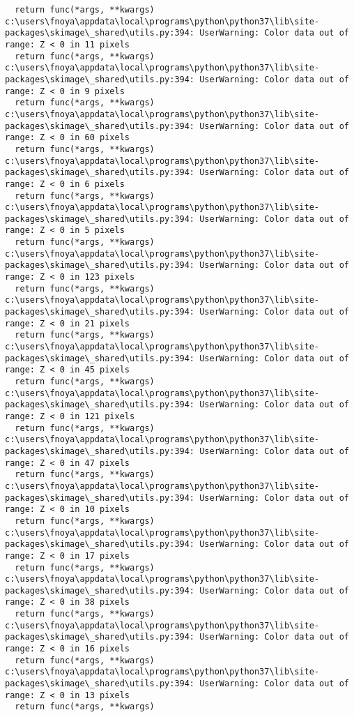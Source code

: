 \documentclass[
]{article}
\begin{document}
\begin{verbatim}
  return func(*args, **kwargs)
c:\users\fnoya\appdata\local\programs\python\python37\lib\site-packages\skimage\_shared\utils.py:394: UserWarning: Color data out of range: Z < 0 in 11 pixels
  return func(*args, **kwargs)
c:\users\fnoya\appdata\local\programs\python\python37\lib\site-packages\skimage\_shared\utils.py:394: UserWarning: Color data out of range: Z < 0 in 9 pixels
  return func(*args, **kwargs)
c:\users\fnoya\appdata\local\programs\python\python37\lib\site-packages\skimage\_shared\utils.py:394: UserWarning: Color data out of range: Z < 0 in 60 pixels
  return func(*args, **kwargs)
c:\users\fnoya\appdata\local\programs\python\python37\lib\site-packages\skimage\_shared\utils.py:394: UserWarning: Color data out of range: Z < 0 in 6 pixels
  return func(*args, **kwargs)
c:\users\fnoya\appdata\local\programs\python\python37\lib\site-packages\skimage\_shared\utils.py:394: UserWarning: Color data out of range: Z < 0 in 5 pixels
  return func(*args, **kwargs)
c:\users\fnoya\appdata\local\programs\python\python37\lib\site-packages\skimage\_shared\utils.py:394: UserWarning: Color data out of range: Z < 0 in 123 pixels
  return func(*args, **kwargs)
c:\users\fnoya\appdata\local\programs\python\python37\lib\site-packages\skimage\_shared\utils.py:394: UserWarning: Color data out of range: Z < 0 in 21 pixels
  return func(*args, **kwargs)
c:\users\fnoya\appdata\local\programs\python\python37\lib\site-packages\skimage\_shared\utils.py:394: UserWarning: Color data out of range: Z < 0 in 45 pixels
  return func(*args, **kwargs)
c:\users\fnoya\appdata\local\programs\python\python37\lib\site-packages\skimage\_shared\utils.py:394: UserWarning: Color data out of range: Z < 0 in 121 pixels
  return func(*args, **kwargs)
c:\users\fnoya\appdata\local\programs\python\python37\lib\site-packages\skimage\_shared\utils.py:394: UserWarning: Color data out of range: Z < 0 in 47 pixels
  return func(*args, **kwargs)
c:\users\fnoya\appdata\local\programs\python\python37\lib\site-packages\skimage\_shared\utils.py:394: UserWarning: Color data out of range: Z < 0 in 10 pixels
  return func(*args, **kwargs)
c:\users\fnoya\appdata\local\programs\python\python37\lib\site-packages\skimage\_shared\utils.py:394: UserWarning: Color data out of range: Z < 0 in 17 pixels
  return func(*args, **kwargs)
c:\users\fnoya\appdata\local\programs\python\python37\lib\site-packages\skimage\_shared\utils.py:394: UserWarning: Color data out of range: Z < 0 in 38 pixels
  return func(*args, **kwargs)
c:\users\fnoya\appdata\local\programs\python\python37\lib\site-packages\skimage\_shared\utils.py:394: UserWarning: Color data out of range: Z < 0 in 16 pixels
  return func(*args, **kwargs)
c:\users\fnoya\appdata\local\programs\python\python37\lib\site-packages\skimage\_shared\utils.py:394: UserWarning: Color data out of range: Z < 0 in 13 pixels
  return func(*args, **kwargs)
\end{verbatim}
\end{document}
